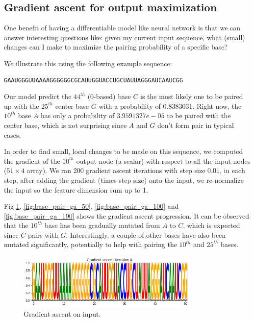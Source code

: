 \documentclass{proposal}
\begin{document}

\subsection{Gradient ascent for output maximization}

One benefit of having a differentiable model like neural network is that we can answer interesting questions like:
given my current input sequence, what (small) changes can I make to maximize the pairing probability of a specific base?

We illustrate this using the following example sequence:

\begin{verbatim}
GAAUGGGUUAAAAGGGGGGCGCAUUGGUACCUGCUAUUAGGGAUCAAUCGG
\end{verbatim}

Our model predict the $44^{th}$ (0-based) base $C$ is the most
likely one to be paired up with the $25^{th}$ center base $G$ with a probability of $0.8383031$.
Right now, the $10^{th}$ base $A$ has only a probability of $3.9591327e-05$ to be paired with the center base,
which is not surprising since $A$ and $G$ don't form pair in typical cases.


In order to find small, local changes to be made on this sequence,
we computed the gradient of the $10^{th}$ output node (a scalar) with respect to all the input nodes ($51 \times 4$ array).
We ran $200$ gradient ascent iterations with step size $0.01$,
in each step, after adding the gradient (times step size) onto the input,
we re-normalize the input so the feature dimension sum up to 1.

Fig \ref{fig:base_pair_ga_0}, \ref{fig:base_pair_ga_50}, \ref{fig:base_pair_ga_100} and \ref{fig:base_pair_ga_190}
shows the gradient ascent progression.
It can be observed that the $10^{th}$ base has been gradually mutated from $A$ to $C$, which is expected since $C$ pairs with $G$.
Interestingly, a couple of other bases have also been mutated significantly, potentially to help with pairing the $10^{th}$ and $25^{th}$ bases.


\begin{figure}[h!]
    \centering
    \includegraphics[width=0.8\textwidth]{plot/base_pair_ga_0.png}
    \caption{Gradient ascent on input.}
    \label{fig:base_pair_ga_0}
    \centering
\end{figure}
\end{document}
